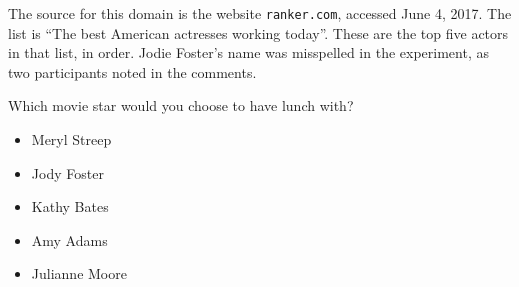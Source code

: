 The source for this domain is the website \texttt{ranker.com}, accessed June 4, 2017.
The list is ``The best American actresses working today''.
These are the top five actors in that list, in order.
Jodie Foster's name was misspelled in the experiment, as two participants noted in the comments.

\begin{tcolorbox}
Which movie star would you choose to have lunch with?

\begin{itemize}
	\item Meryl Streep
	\item Jody Foster
	\item Kathy Bates
	\item Amy Adams
	\item Julianne Moore
\end{itemize}
\end{tcolorbox}
